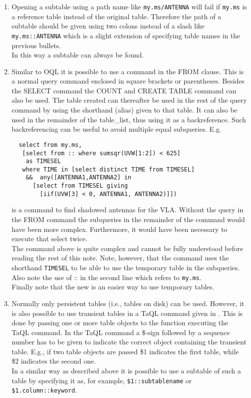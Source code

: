 \begin{enumerate}
\item
Opening a subtable using a path name like \texttt{my.ms/ANTENNA}
will fail if \texttt{my.ms} is a reference table instead of the
original table.
Therefore the path of a subtable should be given using two colons instead of
a slash like \texttt{my.ms::ANTENNA} which is a slight extension of
specifying table names in the previous bullets.
\\In this way a subtable can always be found.

\item
\label{TAQL:BACKREF}
Similar to OQL it is possible to use a
command in the FROM clause. This is a normal query command
enclosed in square brackets or parentheses. Besides the SELECT command
the COUNT and CREATE TABLE command can also be used.
The table created can thereafter be used in the rest of the
query command by using the shorthand (alias) given to that table. It can also
be used in the remainder of the table\_list, thus using it as a backreference.
Such backreferencing can be useful to avoid
multiple equal subqueries. E.g.
\begin{verbatim}
  select from my.ms,
   [select from :: where sumsqr(UVW[1:2]) < 625]
    as TIMESEL
   where TIME in [select distinct TIME from TIMESEL]
    &&  any([ANTENNA1,ANTENNA2] in
      [select from TIMESEL giving
        [iif(UVW[3] < 0, ANTENNA1, ANTENNA2)]])
\end{verbatim}
is a command to find shadowed antennas for the VLA.
Without the query in the FROM command the subqueries in the
remainder of the command would have been more complex.
Furthermore, it would have been necessary to execute that
select twice.
\\The command above is quite complex and cannot be fully understood
before reading the rest of this note.
Note, however, that the command uses the shorthand \texttt{TIMESEL}
to be able to use the temporary table in the subqueries.
\\Also note the use of :: in the second line which refers to \texttt{my.ms}.
\\Finally note that the new  
 is an easier way to use temporary tables.

\item
Normally only persistent tables (i.e., tables on disk) can
be used. However, it is also possible to use transient tables
in a TaQL command given in
.
This is done by passing one or more table objects to the
function executing the TaQL command. In the TaQL command a
\$-sign followed by a sequence number has to be given to
indicate the correct object containing the transient table.
E.g., if two
table objects are passed \$1 indicates the first table, while \$2
indicates the second one.
\\In a similar way as described above it is possible to use a subtable
 of such a table by specifying it as, for example,
\texttt{\$1::subtablename} or \texttt{\$1.column::keyword}.


\end{enumerate}
